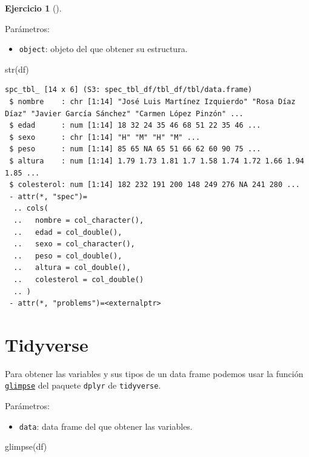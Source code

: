 \documentclass[
  a4paper,
]{scrreport}
\newenvironment{Shaded}{\begin{snugshade}}{\end{snugshade}}
\newcommand{\FunctionTok}[1]{\textcolor[rgb]{0.28,0.35,0.67}{#1}}
\newcommand{\NormalTok}[1]{\textcolor[rgb]{0.00,0.23,0.31}{#1}}
\providecommand{\tightlist}{%
  \setlength{\itemsep}{0pt}\setlength{\parskip}{0pt}}\usepackage{longtable,booktabs,array}
\theoremstyle{definition}
\newtheorem{exercise}{Ejercicio}[chapter]
\theoremstyle{remark}
\begin{document}
\begin{exercise}[]
\begin{enumerate}
\begin{tcolorbox}
  Parámetros:

  \begin{itemize}
  \tightlist
  \item
    \texttt{object}: objeto del que obtener su estructura.
  \end{itemize}

\begin{Shaded}
\begin{Highlighting}[]
\FunctionTok{str}\NormalTok{(df)}
\end{Highlighting}
\end{Shaded}

\begin{verbatim}
spc_tbl_ [14 x 6] (S3: spec_tbl_df/tbl_df/tbl/data.frame)
 $ nombre    : chr [1:14] "José Luis Martínez Izquierdo" "Rosa Díaz Díaz" "Javier García Sánchez" "Carmen López Pinzón" ...
 $ edad      : num [1:14] 18 32 24 35 46 68 51 22 35 46 ...
 $ sexo      : chr [1:14] "H" "M" "H" "M" ...
 $ peso      : num [1:14] 85 65 NA 65 51 66 62 60 90 75 ...
 $ altura    : num [1:14] 1.79 1.73 1.81 1.7 1.58 1.74 1.72 1.66 1.94 1.85 ...
 $ colesterol: num [1:14] 182 232 191 200 148 249 276 NA 241 280 ...
 - attr(*, "spec")=
  .. cols(
  ..   nombre = col_character(),
  ..   edad = col_double(),
  ..   sexo = col_character(),
  ..   peso = col_double(),
  ..   altura = col_double(),
  ..   colesterol = col_double()
  .. )
 - attr(*, "problems")=<externalptr> 
\end{verbatim}

  \section{Tidyverse}

  Para obtener las variables y sus tipos de un data frame podemos usar
  la función
  \href{https://dplyr.tidyverse.org/reference/glimpse.html}{\texttt{glimpse}}
  del paquete \texttt{dplyr} de \texttt{tidyverse}.

  Parámetros:

  \begin{itemize}
  \tightlist
  \item
    \texttt{data}: data frame del que obtener las variables.
  \end{itemize}

\begin{Shaded}
\begin{Highlighting}[]
\FunctionTok{glimpse}\NormalTok{(df)}
\end{Highlighting}
\end{Shaded}


\end{tcolorbox}
\end{enumerate}
\end{exercise}
\end{document}
